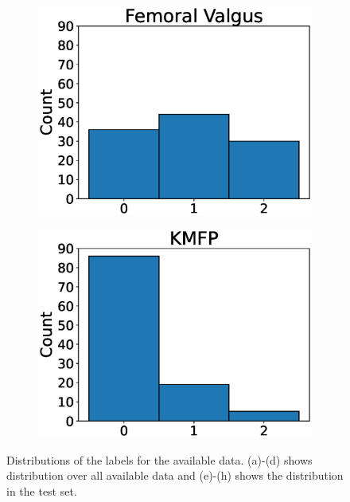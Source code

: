 \begin{figure}
\begin{subfigure}[t]{0.24\textwidth}
    \includegraphics[width=\textwidth]{files/figs/met/femval-test-labels.eps}
    \caption{}
    \label{fig:femval-labels-test}
  \end{subfigure}
  \begin{subfigure}[t]{0.24\textwidth}
    \includegraphics[width=\textwidth]{files/figs/met/kmfp-test-labels.eps}
    \caption{}
    \label{fig:kmfp-labels-test}
  \end{subfigure}

  \caption{Distributions of the labels for the available data. (a)-(d) shows distribution over all available data and (e)-(h) shows the distribution in the test set.}
  \label{fig:label-dist}
\end{figure}



